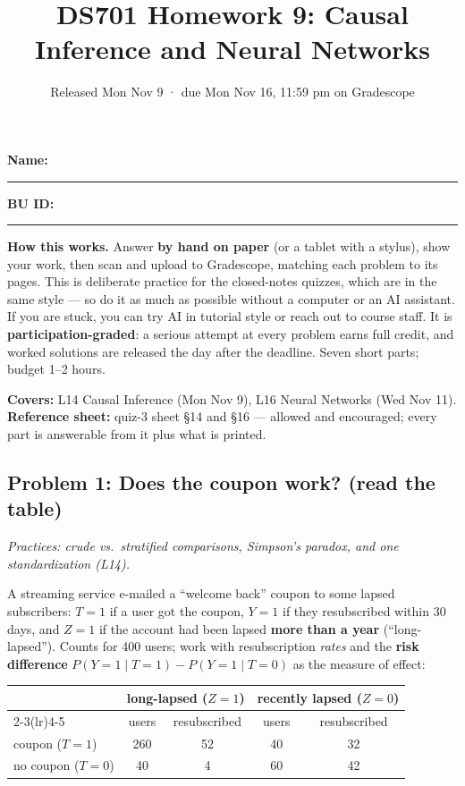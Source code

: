 \documentclass[
  11pt,
]{article}
\title{DS701 Homework 9: Causal Inference and Neural Networks}
\subtitle{Released Mon Nov 9 · due Mon Nov 16, 11:59 pm on Gradescope}
\author{}
\date{}
\begin{document}
\maketitle


\noindent\textbf{Name:}\ \rule{2.0in}{0.4pt}\qquad\textbf{BU ID:}\ \rule{1.2in}{0.4pt}
\vspace{6pt}

\textbf{How this works.} Answer \textbf{by hand on paper} (or a tablet
with a stylus), show your work, then scan and upload to Gradescope,
matching each problem to its pages. This is deliberate practice for the
closed-notes quizzes, which are in the same style --- so do it as much
as possible without a computer or an AI assistant. If you are stuck, you
can try AI in tutorial style or reach out to course staff. It is
\textbf{participation-graded}: a serious attempt at every problem earns
full credit, and worked solutions are released the day after the
deadline. Seven short parts; budget 1--2 hours.

\textbf{Covers:} L14 Causal Inference (Mon Nov 9), L16 Neural Networks
(Wed Nov 11). \textbf{Reference sheet:} quiz-3 sheet §14 and §16 ---
allowed and encouraged; every part is answerable from it plus what is
printed.

\subsection{Problem 1: Does the coupon work? (read the
table)}\label{problem-1-does-the-coupon-work-read-the-table}

\emph{Practices: crude vs.~stratified comparisons, Simpson's paradox,
and one standardization (L14).}

A streaming service e-mailed a ``welcome back'' coupon to some lapsed
subscribers: \(T=1\) if a user got the coupon, \(Y=1\) if they
resubscribed within 30 days, and \(Z=1\) if the account had been lapsed
\textbf{more than a year} (``long-lapsed''). Counts for 400 users; work
with resubscription \emph{rates} and the \textbf{risk difference}
\(P(Y{=}1\mid T{=}1)-P(Y{=}1\mid T{=}0)\) as the measure of effect:

\begin{center}\small\setlength{\tabcolsep}{7pt}
\begin{tabular}{@{}lcccc@{}}\toprule
 & \multicolumn{2}{c}{long-lapsed ($Z{=}1$)} & \multicolumn{2}{c}{recently lapsed ($Z{=}0$)}\\
\cmidrule(lr){2-3}\cmidrule(lr){4-5}
 & users & resubscribed & users & resubscribed\\ \midrule
coupon ($T{=}1$)    & 260 & 52 & 40 & 32\\
no coupon ($T{=}0$) &  40 &  4 & 60 & 42\\
\bottomrule\end{tabular}\end{center}
\end{document}
